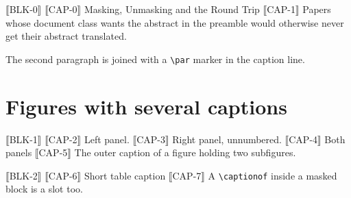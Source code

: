 ⟦BLK-0⟧
⟦CAP-0⟧ Masking, Unmasking and the Round Trip
⟦CAP-1⟧ Papers whose document class wants the abstract in the preamble would otherwise never get their abstract translated. \par The second paragraph is joined with a \verb|\par| marker in the caption line.

\section{Figures with several captions}
⟦BLK-1⟧
⟦CAP-2⟧ Left panel.
⟦CAP-3⟧ Right panel, unnumbered.
⟦CAP-4⟧ Both panels
⟦CAP-5⟧ The outer caption of a figure holding two subfigures.

⟦BLK-2⟧
⟦CAP-6⟧ Short table caption
⟦CAP-7⟧ A \verb|\captionof| inside a masked block is a slot too.


